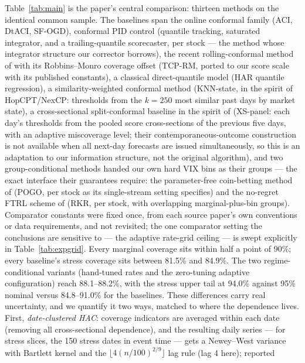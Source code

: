Table~\ref{tab:main} is the paper's central comparison: thirteen methods
on the identical common sample. The baselines span the online conformal
family (ACI, DtACI, SF-OGD), conformal PID control
\citep{angelopoulos2023conformal} (quantile tracking, saturated
integrator, and a trailing-quantile scorecaster, per stock --- the
method whose integrator structure our corrector borrows), the recent
rolling-conformal method of
\citet{aich2025temporal} with its Robbins--Monro coverage offset (TCP-RM,
ported to our score scale with its published constants), a classical
direct-quantile model (HAR quantile regression), a similarity-weighted
conformal method (KNN-state, in the spirit of HopCPT/NexCP: thresholds
from the $k = 250$ most similar past days by market state), a
cross-sectional split-conformal baseline in the spirit of
\citet{wtqa2026panel} (XS-panel: each day's thresholds from the pooled
score cross-sections of the previous five days, with an adaptive
miscoverage level; their contemporaneous-outcome construction is not
available when all next-day forecasts are issued simultaneously, so this
is an adaptation to our information structure, not the original
algorithm), and two group-conditional methods handed our own hard VIX
bins as their groups --- the exact interface their guarantees require:
the parameter-free coin-betting method of
\citet{bharti2026parameterfree} (POGO, per stock as its single-stream
setting specifies) and the no-regret FTRL scheme of
\citet{ramalingam2025noregret} (RKR, per stock, with overlapping
marginal-plus-bin groups). Comparator constants were fixed once, from
each source paper's own conventions or data requirements, and not
revisited; the one comparator setting the conclusions are sensitive to
--- the adaptive rate-grid ceiling --- is swept explicitly in
Table~\ref{tab:expgrid}. Every marginal coverage sits
within half a point of 90\%; every baseline's stress coverage sits between
81.5\% and 84.9\%. The two regime-conditional variants (hand-tuned
rates and the zero-tuning adaptive configuration) reach 88.1--88.2\%,
with the stress upper tail at 94.0\% against 95\% nominal versus
84.8--91.0\% for the baselines. These differences carry real
uncertainty, and we quantify it two ways, matched to where the
dependence lives. First, \emph{date-clustered HAC}: coverage indicators
are averaged within each date (removing all cross-sectional dependence),
and the resulting daily series --- for stress slices, the 150 stress
dates in event time --- gets a Newey--West variance with Bartlett kernel
and the $\lfloor 4(n/100)^{2/9} \rfloor$ lag rule (lag 4 here); reported
